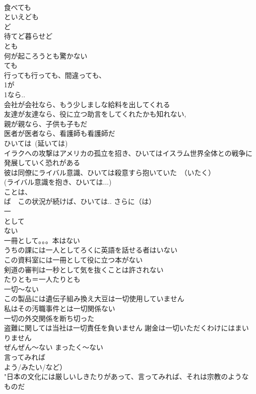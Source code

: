 \documentclass[8pt]{extreport}
\begin{document}
\begin{CJK}{UTF8}{min}
\\	食べても 
\\	といえども 
\\	ど 
\\	待てど暮らせど 
\\	とも 
\\	何が起ころうとも驚かない 
\\	ても 
\\	行っても行っても、間違っても、
\\	1が
\\	1なら.. 
\\	会社が会社なら、もう少しましな給料を出してくれる 
\\	友達が友達なら、役に立つ助言をしてくれたかも知れない,
\\	親が親なら、子供も子もだ 
\\	医者が医者なら、看護師も看護師だ 
\\	ひいては~(延いては)	
\\	イラクへの攻撃はアメリカの孤立を招き、ひいてはイスラム世界全体との戦争に発展していく恐れがある 
\\	彼は同僚にライバル意識、ひいては殺意すら抱いていた　（いたく） 
\\	(ライバル意識を抱き、ひいては...) 
\\	ことは、
\\	ば　この状況が続けば、ひいては..	さらに（は） 
\\	一
\\	として
\\	[は]ない 
\\	一冊として。。。本はない	
\\	うちの課には一人としてろくに英語を話せる者はいない 
\\	この資料室には一冊として役に立つ本がない 
\\	剣道の審判は一秒として気を抜くことは許されない 
\\	たりとも＝一人たりとも 
\\	一切～ない	
\\	この製品には遺伝子組み換え大豆は一切使用していません 
\\	私はその汚職事件とは一切関係ない 
\\	一切の外交関係を断ち切った 
\\	盗難に関しては当社は一切責任を負いません 謝金は一切いただくわけにはまいりません　
\\	ぜんぜん～ない まったく～ない
\\	言ってみれば 
\\	よう/みたい/など）	
\\	"日本の文化には厳しいしきたりがあって、言ってみれば、それは宗教のようなものだ 

\end{CJK}
\end{document}
